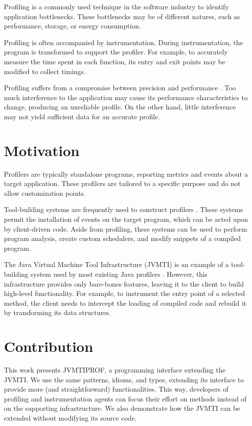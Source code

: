 \label{cap:introduction}

Profiling is a commonly used technique in the software industry to identify application bottlenecks. These bottlenecks may be of different natures, such as performance, storage, or energy consumption.

Profiling is often accompanied by instrumentation. During instrumentation, the program is transformed to support the profiler. For example, to accurately measure the time spent in each function, its entry and exit points may be modified to collect timings.

Profiling suffers from a compromise between precision and performance \cite{ponder1988inaccuracies}. Too much interference to the application may cause its performance characteristics to change, producing an unreliable profile. On the other hand, little interference may not yield sufficient data for an accurate profile.

\section{Motivation}

Profilers are typically standalone programs, reporting metrics and events about a target application. These profilers are tailored to a specific purpose and do not allow customization points.

Tool-building systems are frequently used to construct profilers \cite{srivastava1994atom,nethercote2007valgrind}. These systems permit the installation of events on the target program, which can be acted upon by client-driven code. Aside from profiling, these systems can be used to perform program analysis, create custom schedulers, and modify snippets of a compiled program.

The Java Virtual Machine Tool Infrastructure (JVMTI) is an example of a tool-building system used by most existing Java profilers \cite{mytkowicz2010evaluating}. However, this infrastructure provides only bare-bones features, leaving it to the client to build high-level functionality. For example, to instrument the entry point of a selected method, the client needs to intercept the loading of compiled code and rebuild it by transforming its data structures.

\section{Contribution}

This work presents JVMTIPROF, a programming interface extending the JVMTI. We use the same patterns, idioms, and types, extending its interface to provide more (and straightforward) functionalities. This way, developers of profiling and instrumentation agents can focus their effort on methods instead of on the supporting infrastructure. We also demonstrate how the JVMTI can be extended without modifying its source code.

